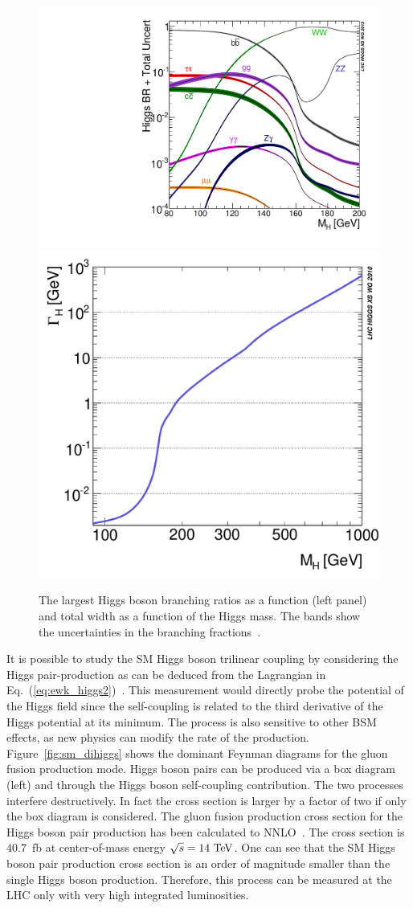 \begin{figure}[h]
\centering
\includegraphics[width=0.49\columnwidth]{figures_chapter2/Higgs_BR_LM}
\includegraphics[width=0.49\columnwidth]{figures_chapter2/YRHXS_BR_fig2}
\caption{The largest Higgs boson branching ratios as a function (left panel) and total width as a function of the Higgs mass. The bands show the uncertainties in the branching fractions~\cite{Dittmaier:2011ti,Dittmaier:2012vm,Heinemeyer:2013tqa}.} 
\label{fig:higgs_decay}
\end{figure} 

It is possible to study the SM Higgs boson trilinear coupling by considering the Higgs pair-production as can be deduced from the Lagrangian in Eq.~(\ref{eq:ewk_higgs2})~\cite{Glover:1987nx,Plehn:1996wb,Djouadi:1999rca,Gianotti:2002xx,Baur:2003gpa,Baur:2003gp,Baglio:2012np}. This measurement would directly probe the potential of the Higgs field since the self-coupling is related to the third derivative of the Higgs potential at its minimum. The process is also sensitive to other BSM effects, as new physics can modify the rate of the production. Figure~\ref{fig:sm_dihiggs} shows the 
dominant Feynman diagrams for the gluon fusion production mode. Higgs boson pairs can be produced via a box diagram (left) and through the Higgs boson self-coupling contribution. The two processes interfere destructively. In fact the cross section is larger by a factor of two if only the box diagram is considered. The gluon fusion production cross section for the Higgs boson pair production has been calculated to NNLO~\cite{Dawson:1998py,Grigo:2014jma}. The cross section is $40.7$~fb at center-of-mass energy $\sqrt{s}=14~\mathrm{Te\kern -0.1em V}$. One can see that the SM Higgs boson pair production cross section is an order of magnitude smaller than the single Higgs boson production. Therefore, this process can be measured at the LHC only with very high integrated luminosities.

